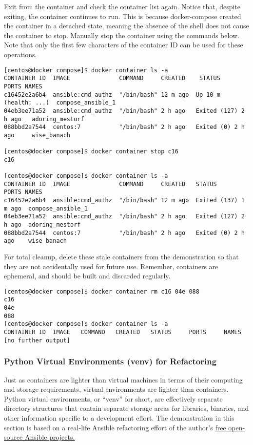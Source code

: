 Exit from the container and check the container list again. Notice that,
despite exiting, the container continues to run. This is because
docker-compose created the container in a detached state, meaning the absence
of the shell does not cause the container to stop. Manually stop the container
using the commands below. Note that only the first few characters of the
container ID can be used for these operations.

\begin{verbatim}
[centos@docker compose]$ docker container ls -a
CONTAINER ID  IMAGE              COMMAND     CREATED    STATUS          PORTS NAMES
c16452e2a6b4  ansible:cmd_authz  "/bin/bash" 12 m ago  Up 10 m (health: ...)  compose_ansible_1
04eb3ee71a52  ansible:cmd_authz  "/bin/bash" 2 h ago   Exited (127) 2 h ago   adoring_mestorf
088bbd2a7544  centos:7           "/bin/bash" 2 h ago   Exited (0) 2 h ago     wise_banach

[centos@docker compose]$ docker container stop c16
c16

[centos@docker compose]$ docker container ls -a
CONTAINER ID  IMAGE              COMMAND     CREATED   STATUS          PORTS NAMES
c16452e2a6b4  ansible:cmd_authz  "/bin/bash" 12 m ago  Exited (137) 1 m ago  compose_ansible_1
04eb3ee71a52  ansible:cmd_authz  "/bin/bash" 2 h ago   Exited (127) 2 h ago  adoring_mestorf
088bbd2a7544  centos:7           "/bin/bash" 2 h ago   Exited (0) 2 h ago    wise_banach
\end{verbatim}

For total cleanup, delete these stale containers from the demonstration so
that they are not accidentally used for future use. Remember, containers are
ephemeral, and should be built and discarded regularly.


\begin{verbatim}
[centos@docker compose]$ docker container rm c16 04e 088
c16
04e
088
[centos@docker compose]$ docker container ls -a
CONTAINER ID  IMAGE   COMMAND   CREATED   STATUS     PORTS     NAMES
[no further output]
\end{verbatim}

\subsubsection{Python Virtual Environments (venv) for Refactoring}
Just as containers are lighter than virtual machines in terms of their
computing and storage requirements, virtual environments are lighter than
containers. Python virtual environments, or ``venv'' for short, are effectively
separate directory structures that contain separate storage areas for
libraries, binaries, and other information specific to a development effort.
The demonstration in this section is based on a real-life Ansible refactoring
effort of the author's
\href{https://github.com/nickrusso42518/}{free open-source Ansible projects.} \\

